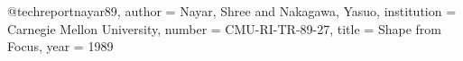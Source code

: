 @techreport{nayar89,
  author = {Nayar, Shree and Nakagawa, Yasuo},
  institution = {Carnegie Mellon University},
  number = {CMU-RI-TR-89-27},
  title = {{S}hape from {F}ocus},
  year = {1989}
}